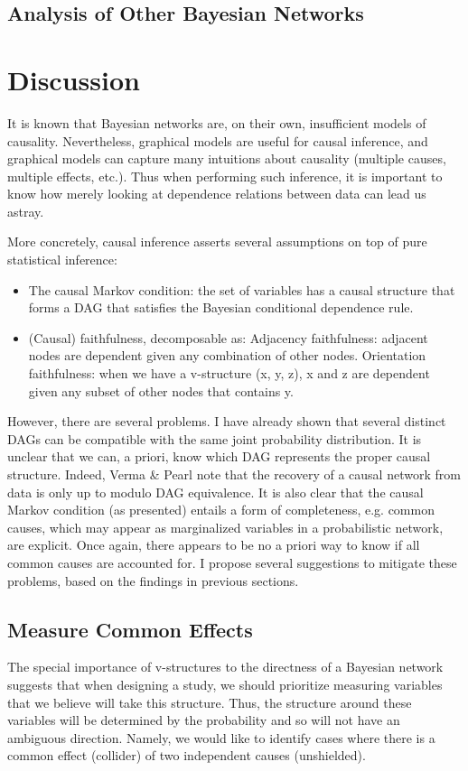 \documentclass{article}
\begin{document}
	\subsection{Analysis of Other Bayesian Networks}
	
	\section{Discussion}
	\label{discussion}
	
	It is known that Bayesian networks are, on their own, insufficient models of causality.
	Nevertheless, graphical models are useful for causal inference, and graphical models can capture many intuitions about causality (multiple causes, multiple effects, etc.).
	Thus when performing such inference, it is important to know how merely looking at dependence relations between data can lead us astray.
	
	More concretely, causal inference asserts several assumptions on top of pure statistical inference\cite{ramsey2012adjacencyfaithfulness}:
	\begin{itemize}
		\item The causal Markov condition: the set of variables has a causal structure that forms a DAG that satisfies the Bayesian conditional dependence rule.
		\item (Causal) faithfulness, decomposable as:
			\subitem Adjacency faithfulness: adjacent nodes are dependent given any combination of other nodes.
			\subitem Orientation faithfulness: when we have a v-structure (x, y, z), x and z are dependent given any subset of other nodes that contains y.
	\end{itemize}
	However, there are several problems.
	I have already shown that several distinct DAGs can be compatible with the same joint probability distribution.
	It is unclear that we can, a priori, know which DAG represents the proper causal structure.
	Indeed, Verma \& Pearl note that the recovery of a causal network from data is only up to modulo DAG equivalence\cite{verma2013equivalence}.
	It is also clear that the causal Markov condition (as presented) entails a form of completeness, e.g. common causes, which may appear as marginalized variables in a probabilistic network, are explicit.
	Once again, there appears to be no a priori way to know if all common causes are accounted for. I propose several suggestions to mitigate these problems, based on the findings in previous sections.
	
	\subsection{Measure Common Effects}
	The special importance of v-structures to the directness of a Bayesian network suggests that when designing a study, we should prioritize measuring variables that we believe will take this structure.
	Thus, the structure around these variables will be determined by the probability and so will not have an ambiguous direction.
	Namely, we would like to identify cases where there is a common effect (collider) of two independent causes (unshielded).
	
\end{document}

